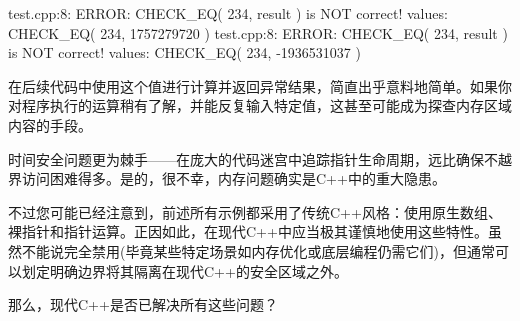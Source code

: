 \begin{shell}
test.cpp:8: ERROR: CHECK_EQ( 234, result ) is NOT correct!
  values: CHECK_EQ( 234, 1757279720 )
test.cpp:8: ERROR: CHECK_EQ( 234, result ) is NOT correct!
  values: CHECK_EQ( 234, -1936531037 )
\end{shell}

在后续代码中使用这个值进行计算并返回异常结果，简直出乎意料地简单。如果你对程序执行的运算稍有了解，并能反复输入特定值，这甚至可能成为探查内存区域内容的手段。

时间安全问题更为棘手——在庞大的代码迷宫中追踪指针生命周期，远比确保不越界访问困难得多。是的，很不幸，内存问题确实是C++中的重大隐患。

不过您可能已经注意到，前述所有示例都采用了传统C++风格：使用原生数组、裸指针和指针运算。正因如此，在现代C++中应当极其谨慎地使用这些特性。虽然不能说完全禁用(毕竟某些特定场景如内存优化或底层编程仍需它们)，但通常可以划定明确边界将其隔离在现代C++的安全区域之外。

那么，现代C++是否已解决所有这些问题？
